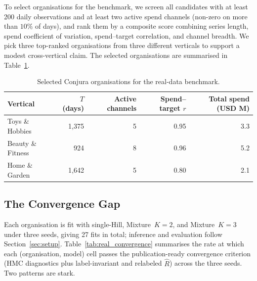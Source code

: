 \documentclass[11pt]{article}
\begin{document}
To select organisations for the benchmark, we screen all candidates with at least 200 daily observations and at least two active spend channels (non-zero on more than $10\%$ of days), and rank them by a composite score combining series length, spend coefficient of variation, spend--target correlation, and channel breadth. We pick three top-ranked organisations from three different verticals to support a modest cross-vertical claim. The selected organisations are summarised in Table~\ref{tab:orgs}.

\begin{table}[ht]
\centering
\caption{Selected Conjura organisations for the real-data benchmark.}
\label{tab:orgs}
\begin{tabular}{lrrrr}
\toprule
Vertical & $T$ (days) & Active channels & Spend--target $r$ & Total spend (USD M) \\
\midrule
Toys \& Hobbies     & 1{,}375 & 5 & 0.95 & 3.3 \\
Beauty \& Fitness   &    924  & 8 & 0.96 & 5.2 \\
Home \& Garden      & 1{,}642 & 5 & 0.80 & 2.1 \\
\bottomrule
\end{tabular}
\end{table}

\subsection{The Convergence Gap}
\label{sec:convergence-gap}

Each organisation is fit with single-Hill, Mixture~$K=2$, and Mixture~$K=3$ under three seeds, giving 27 fits in total; inference and evaluation follow Section~\ref{sec:setup}. Table~\ref{tab:real_convergence} summarises the rate at which each (organisation, model) cell passes the publication-ready convergence criterion (HMC diagnostics plus label-invariant and relabeled $\widehat{R}$) across the three seeds. Two patterns are stark.
\end{document}
